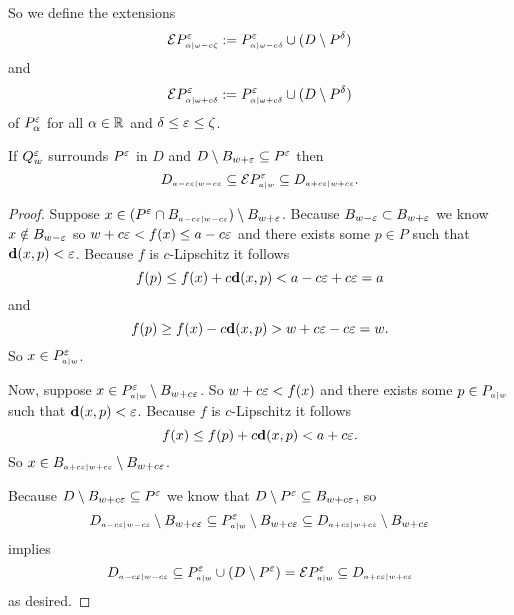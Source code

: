 So we define the extensions
\[\ext{P^\e\subi{\omega-c\zeta}{\alpha}} := P^\e\subi{\omega-c\delta}{\alpha}\cup (D\setminus P^\of)\]
and
\[\ext{P^\e\subi{\omega+c\delta}{\alpha}} := P^\e\subi{\omega+c\delta}{\alpha}\cup (D\setminus P^\of)\]
of $P^\e_\alpha$ for all $\alpha\in\R$ and $\delta\leq\e\leq\zeta$.

\begin{lemma}\label{lem:p_interleave}
 If $Q_w^\e$ surrounds $P^\e$ in $D$ and $D\setminus B_{w + \e}\subseteq P^\e$ then
 \[ D\subi{w-c\e}{a-c\e} \subseteq \ext{P\subi{w}{a}^\e}\subseteq D\subi{w+c\e}{a+c\e}.\]
\end{lemma}
\begin{proof}
  Suppose $x\in (P^\e\cap B\subi{w-c\e}{a-c\e})\setminus B_{w+\e}$.
  Because $B_{w-\e}\subset B_{w+\e}$ we know $x\notin B_{w-\e}$ so $w+c\e < f(x)\leq a-c\e$ and there exists some $p\in P$ such that $\dist(x, p) < \e$.
  Because $f$ is $c$-Lipschitz it follows
  \[ f(p)\leq f(x) + c\dist(x, p) < a - c\e + c\e = a\]
  and
  \[ f(p)\geq f(x) - c\dist(x, p) > w+c\e-c\e = w.\]
  So $x\in P\subi{w}{a}^\e$.

  Now, suppose $x\in P\subi{w}{a}^\e\setminus B_{w+c\e}$.
  So $w+c\e < f(x)$ and there exists some $p\in P\subi{w}{a}$ such that $\dist(x,p) < \e$.
  Because $f$ is $c$-Lipschitz it follows
  \[ f(x) \leq f(p) + c\dist(x,p) < a + c\e.\]
  So $x\in B\subi{w+c\e}{a+c\e}\setminus B_{w+c\e}$.

  Because $D\setminus B_{w+c\e}\subseteq P^\e$ we know that $D\setminus P^\e \subseteq B_{w+c\e}$, so
  \[D\subi{w-c\e}{a-c\e}\setminus B_{w+c\e} \subseteq P\subi{w}{a}^\e\setminus B_{w+c\e}\subseteq D\subi{w+c\e}{a+c\e}\setminus B_{w+c\e}\]
  implies
  \[ D\subi{w-c\e}{a-c\e}\subseteq P\subi{w}{a}^\e\cup (D\setminus P^\e) = \ext{P\subi{w}{a}^\e} \subseteq D\subi{w+c\e}{a+c\e} \]
  as desired.
\end{proof}
